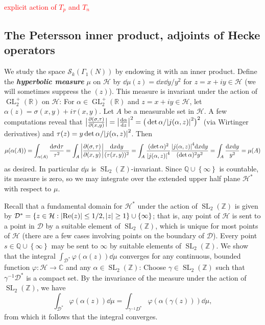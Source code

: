 \documentclass[10pt,leqno,twoside]{article}
\theoremstyle{plain}
\theoremstyle{definition}
\numberwithin{equation}{section}
\numberwithin{lem}{section}
\newcommand{\cbr}[1]{\left\{#1\right\}}
\newcommand{\textib}[1]{\textbf{\textit{#1\index{#1}}}} %
\DeclareMathOperator{\GL}{GL}
\DeclareMathOperator{\SL}{SL}
\newcommand{\slz}{\SL_2(\mathbb{Z})}
\newcommand{\glrp}{\GL_2^+(\mathbb{R})}
\newcommand{\sai}[1]{\textcolor{red}{#1}}
\begin{document}
\sai{explicit action of $T_p$ and $T_n$}

\subsection{The Petersson inner product, adjoints of Hecke operators}
We study the space $\mathcal S_k(\varGamma_1(N))$ by endowing it with an inner product. Define the \textib{hyperbolic measure} $\mu$ on $\mathcal H$ by $\dd\mu(z) = \dd x \dd y / y^2$ for $z = x+iy\in\mathcal H$ (we will sometimes suppress the $(z)$). This measure is invariant under the action of $\glrp$ on $\mathcal H$: For $\alpha \in \glrp$ and $z=x+iy \in \mathcal H$, let $\alpha(z) = \sigma(x,y) + i\tau(x,y)$. Let $A$ be a measurable set in $\mathcal H$. A few computations reveal that $\big|\frac{\partial (\sigma,\tau)}{\partial(x,y)}\big| = \abs{\dv{\alpha}{z}}^2 = \big(\det\alpha/\abs{j(\alpha,z)}^2\big)^2$ (via Wirtinger derivatives) and $\tau(z) = y\det\alpha/\abs{j(\alpha,z)}^2$. Then \[\mu(\alpha(A)) = \int_{\alpha(A)} \frac{\dd\sigma\dd\tau}{\tau^2} = \int_{A}\bigg|\frac{\partial (\sigma,\tau)}{\partial(x,y)}\bigg|\frac{\dd x\dd y}{(\tau(x,y))^2} = \int_A \frac{(\det\alpha)^2}{\abs{j(\alpha,z)}^4}\frac{\abs{j(\alpha,z)}^4\dd x \dd y}{(\det\alpha)^2y^2} =\int_A \frac{\dd x \dd y}{y^2} = \mu(A)\]
as desired. In particular $\dd \mu$ is $\slz$-invariant. Since $\mathbb Q\cup\cbr{\infty}$ is countable, its measure is zero, so we may integrate over the extended upper half plane $\mathcal H^\ast$ with respect to $\mu$.

Recall that a fundamental domain for $\mathcal H^\ast$ under the action of $\slz$ is given by $\mathcal D^\ast = \cbr{z\in\mathcal H : \abs{\Re(z)}\leq 1/2,\abs{z}\geq 1}\cup\cbr{\infty}$; that is, any point of $\mathcal H$ is sent to a point in $\mathcal D$ by a suitable element of $\slz$, which is unique for most points of $\mathcal H$ (there are a few cases involving points on the boundary of $\mathcal D$). Every point $s\in\mathbb Q\cup\cbr{\infty}$ may be sent to $\infty$ by suitable elements of $\slz$. We show that the integral $\int_{\mathcal D^\ast} \varphi(\alpha(z))\dd \mu$ converges for any continuous, bounded function $\varphi\colon\mathcal H\to\mathbb C$ and any $\alpha\in\slz$: Choose $\gamma\in\slz$ such that $\gamma^{-1}\mathcal D^\ast$ is a compact set. By the invariance of the measure under the action of $\slz$, we have
\[\int_{\mathcal D^\ast} \varphi(\alpha(z))\dd \mu = \int_{\mathcal \gamma^{-1} D^\ast} \varphi(\alpha(\gamma(z)))\dd \mu, \] from which it follows that the integral converges.
\end{document}
